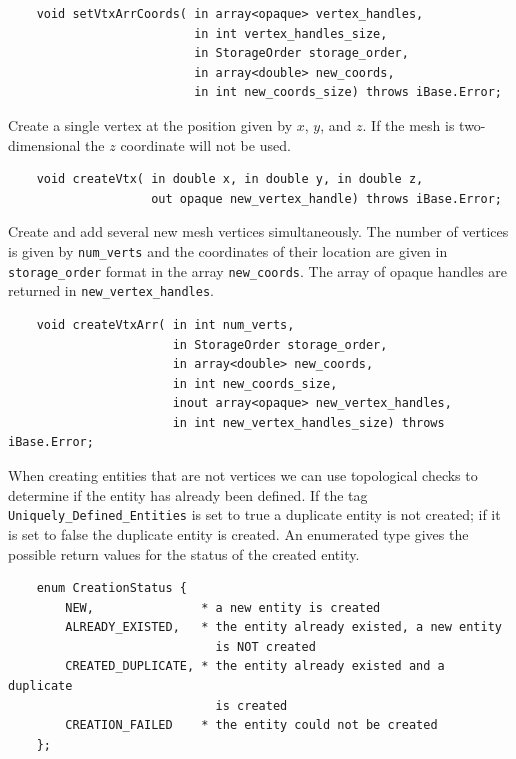 \documentclass{article}
\begin{document}
\begin{verbatim}
    void setVtxArrCoords( in array<opaque> vertex_handles, 
                          in int vertex_handles_size, 
                          in StorageOrder storage_order,  
                          in array<double> new_coords,  
                          in int new_coords_size) throws iBase.Error;
\end{verbatim}

Create a single vertex at the position given by $x$, $y$, and $z$. 
If the mesh is two-dimensional the $z$ coordinate will not be used. 


\begin{verbatim}
    void createVtx( in double x, in double y, in double z, 
                    out opaque new_vertex_handle) throws iBase.Error;
\end{verbatim}


Create and add several new mesh vertices simultaneously. The 
number of vertices is given by {\tt num\_verts} and the coordinates 
of their location are given in {\tt storage\_order} format in the array 
{\tt new\_coords}. The array of opaque handles are returned in {\tt new\_vertex\_handles}. 

\begin{verbatim}
    void createVtxArr( in int num_verts,
                       in StorageOrder storage_order, 
                       in array<double> new_coords, 
                       in int new_coords_size, 
                       inout array<opaque> new_vertex_handles, 
                       in int new_vertex_handles_size) throws iBase.Error;
\end{verbatim}

   When creating entities that are not vertices we can use topological 
checks to determine if the entity has already been defined. If 
the tag {\tt Uniquely\_Defined\_Entities} is set to true a duplicate 
entity is not created; if it is set to false the duplicate entity 
is created. An enumerated type gives the possible return values 
for the status of the created entity.

\begin{verbatim}
    enum CreationStatus { 
        NEW,               * a new entity is created  
        ALREADY_EXISTED,   * the entity already existed, a new entity 
                             is NOT created
        CREATED_DUPLICATE, * the entity already existed and a duplicate
                             is created 
        CREATION_FAILED    * the entity could not be created
    };
\end{verbatim}
\end{document}
